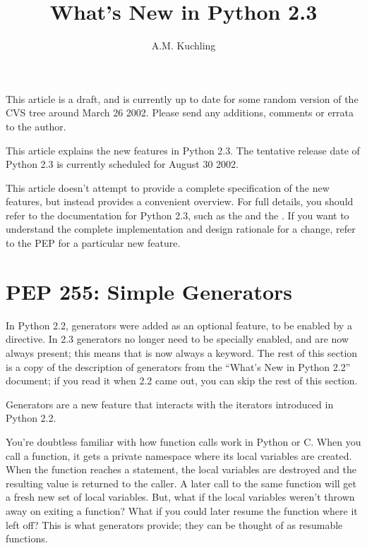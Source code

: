 \documentclass{howto}
\title{What's New in Python 2.3}
\author{A.M. Kuchling}
\begin{document}
\maketitle
\tableofcontents


{\large This article is a draft, and is currently up to date for some
random version of the CVS tree around March 26 2002.  Please send any
additions, comments or errata to the author.}

This article explains the new features in Python 2.3.  The tentative
release date of Python 2.3 is currently scheduled for August 30 2002.

This article doesn't attempt to provide a complete specification of
the new features, but instead provides a convenient overview.  For
full details, you should refer to the documentation for Python 2.3,
such as the
 and the
.  If you want to understand the complete
implementation and design rationale for a change, refer to the PEP for
a particular new feature.


\section{PEP 255: Simple Generators}

In Python 2.2, generators were added as an optional feature, to be
enabled by a  directive.  In
2.3 generators no longer need to be specially enabled, and are now
always present; this means that  is now always a
keyword.  The rest of this section is a copy of the description of
generators from the ``What's New in Python 2.2'' document; if you read
it when 2.2 came out, you can skip the rest of this section.

Generators are a new feature that interacts with the iterators
introduced in Python 2.2.

You're doubtless familiar with how function calls work in Python or
C.  When you call a function, it gets a private namespace where its local
variables are created.  When the function reaches a 
statement, the local variables are destroyed and the resulting value
is returned to the caller.  A later call to the same function will get
a fresh new set of local variables.  But, what if the local variables
weren't thrown away on exiting a function?  What if you could later
resume the function where it left off?  This is what generators
provide; they can be thought of as resumable functions.
\end{document}
